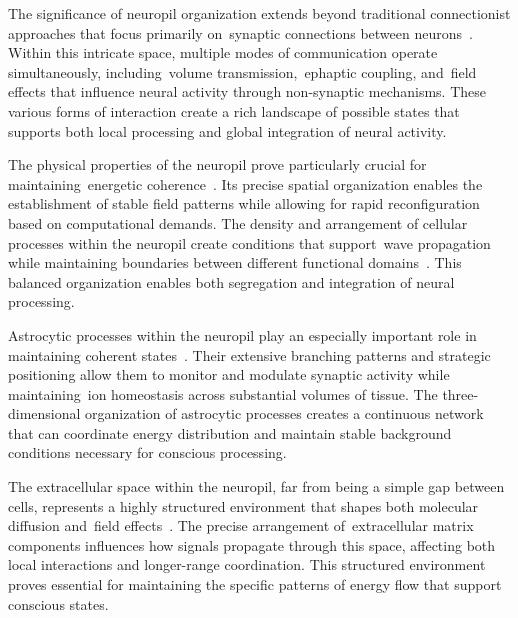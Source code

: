 The significance of neuropil organization extends beyond traditional connectionist approaches that focus primarily on~synaptic connections between neurons~\cite{Kasthuri2015, Beniaguev2021}. Within this intricate space, multiple modes of communication operate simultaneously, including~volume transmission,~ephaptic coupling, and~field effects that influence neural activity through non-synaptic mechanisms. These various forms of interaction create a rich landscape of possible states that supports both local processing and global integration of neural activity.

The physical properties of the neuropil prove particularly crucial for maintaining~energetic coherence~\cite{Korogod2015, Sykova2008}. Its precise spatial organization enables the establishment of stable field patterns while allowing for rapid reconfiguration based on computational demands. The density and arrangement of cellular processes within the neuropil create conditions that support~wave propagation while maintaining boundaries between different functional domains~\cite{Arbib1998, pinotsis2023cytoelectric}. This balanced organization enables both segregation and integration of neural processing.

Astrocytic processes within the neuropil play an especially important role in maintaining coherent states~\cite{Ventura1999, Verkhratsky2018}. Their extensive branching patterns and strategic positioning allow them to monitor and modulate synaptic activity while maintaining~ion homeostasis across substantial volumes of tissue. The three-dimensional organization of astrocytic processes creates a continuous network that can coordinate energy distribution and maintain stable background conditions necessary for conscious processing.

The extracellular space within the neuropil, far from being a simple gap between cells, represents a highly structured environment that shapes both molecular diffusion and~field effects~\cite{Savtchenko2014, Vargova2014}. The precise arrangement of~extracellular matrix components influences how signals propagate through this space, affecting both local interactions and longer-range coordination. This structured environment proves essential for maintaining the specific patterns of energy flow that support conscious states.

